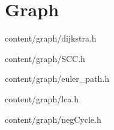\section{Graph}

{}
{content/graph/dijkstra.h}

{}
{content/graph/SCC.h}

{}
{content/graph/euler_path.h}

{}
{content/graph/lca.h}

{}
{content/graph/negCycle.h}
